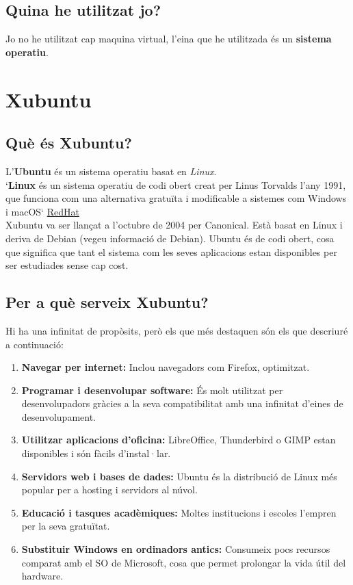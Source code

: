 \subsection{Quina he utilitzat jo?}
Jo no he utilitzat cap maquina virtual, l'eina que he utilitzada és un \textbf{sistema operatiu}.

\section{Xubuntu}
\subsection{Què és Xubuntu?}
L’\textbf{Ubuntu} és un sistema operatiu basat en \textit{Linux}.\\

`\textbf{Linux} és un sistema operatiu de codi obert creat per Linus Torvalds l’any 1991, que funciona com una alternativa gratuïta i modificable a sistemes com Windows i macOS`
\href{https://www.redhat.com/es/topics/linux}{RedHat}\\


Xubuntu va ser llançat a l’octubre de 2004 per Canonical. Està basat en Linux i deriva de Debian (vegeu informació de Debian). Ubuntu és de codi obert, cosa que significa que tant el sistema com les seves aplicacions estan disponibles per ser estudiades sense cap cost.

\subsection{Per a què serveix Xubuntu?}
Hi ha una infinitat de propòsits, però els que més destaquen són els que descriuré a continuació:
\begin{enumerate}
 \item \textbf{Navegar per internet:} Inclou navegadors com Firefox, optimitzat.
 \item \textbf{Programar i desenvolupar software:} És molt utilitzat per desenvolupadors gràcies a la seva compatibilitat amb una infinitat d’eines de desenvolupament.
 \item \textbf{Utilitzar aplicacions d’oficina:} LibreOffice, Thunderbird o GIMP estan disponibles i són fàcils d’instal·lar.
 \item \textbf{Servidors web i bases de dades:} Ubuntu és la distribució de Linux més popular per a hosting i servidors al núvol.
 \item \textbf{Educació i tasques acadèmiques:} Moltes institucions i escoles l’empren per la seva gratuïtat.
 \item \textbf{Substituir Windows en ordinadors antics:} Consumeix pocs recursos comparat amb el SO de Microsoft, cosa que permet prolongar la vida útil del hardware.
\end{enumerate}

